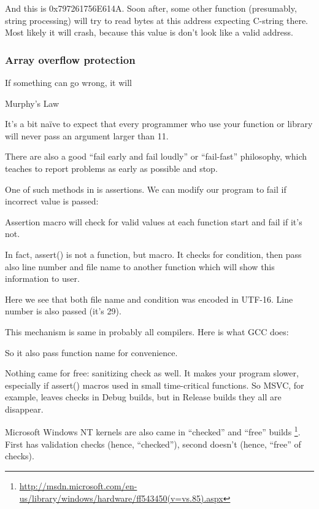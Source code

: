And this is 0x797261756E614A.
Soon after, some other function (presumably, string processing) will try to read bytes at 
this address expecting C-string there.
Most likely it will crash, because this value is don't look like a valid address.

\subsubsection{Array overflow protection}
\epigraph{If something can go wrong, it will}{Murphy's Law}

It's a bit naïve to expect that every programmer who use your function or library will never pass
an argument larger than 11.

There are also a good ``fail early and fail loudly'' or ``fail-fast'' philosophy, 
which teaches to report problems as early as possible and stop.

One of such methods in \CCpp is assertions.
We can modify our program to fail if incorrect value is passed:



Assertion macro will check for valid values at each function start and fail if it's not.



In fact, assert() is not a function, but macro. It checks for condition, then pass also line number and file
name to another function which will show this information to user.

Here we see that both file name and condition was encoded in UTF-16.
Line number is also passed (it's 29).

This mechanism is same in probably all compilers.
Here is what GCC does:



So it also pass function name for convenience.

Nothing came for free: sanitizing check as well.
It makes your program slower, especially if assert() macros used in small time-critical functions.
So MSVC, for example, leaves checks in Debug builds, but in Release builds they all are disappear.
 
Microsoft \gls{Windows NT} kernels are also came in ``checked'' and ``free'' builds
\footnote{\url{http://msdn.microsoft.com/en-us/library/windows/hardware/ff543450(v=vs.85).aspx}}.
First has validation checks (hence, ``checked''), second doesn't (hence, ``free'' of checks).
\fi

